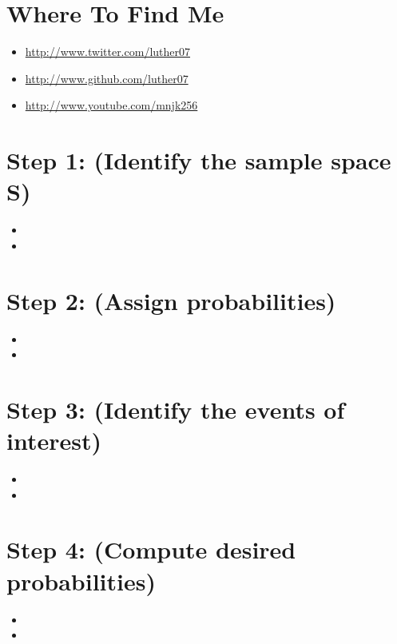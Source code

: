 \documentclass[a4paper,10pt]{article}
\title{}
\author{Mark Johnons \\
luther07@gmail.com}
\date {(312)479-2894}
\begin{document}
\maketitle
\section{Where To Find Me}
\begin{itemize}
\item \url{http://www.twitter.com/luther07}
\item \url{http://www.github.com/luther07}
\item \url{http://www.youtube.com/mnjk256}
\end{itemize}
\section{Step 1: (Identify the sample space S)}
\begin{itemize}
\item
\item
\end{itemize}
\section{Step 2: (Assign probabilities)}
\begin{itemize}
\item
\item
\end{itemize}
\section{Step 3: (Identify the events of interest)}
\begin{itemize}
\item
\item
\end{itemize}
\section{Step 4: (Compute desired probabilities)}
\begin{itemize}
\item
\item
\end{itemize}
\end{document}
